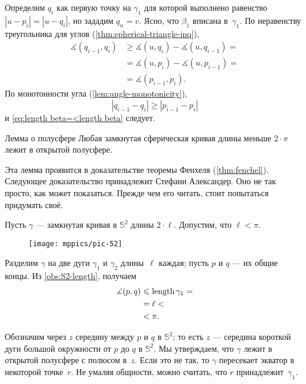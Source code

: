Определим $q_i$ как первую точку на $\gamma_1$ для которой выполнено равенство $|u-p_i|=|u-q_i|$, но зададим $q_n=v$.
Ясно, что $\beta_1$ вписана в~$\gamma_1$.
По неравенству треугольника для углов (\ref{thm:spherical-triangle-inq}),
\begin{align*}
 \measuredangle(q_{i-1},q_i) &\ge  \measuredangle (u, q_i) - \measuredangle ( u , q_{i-1})  =
\\
&= \measuredangle (u,p_i) - \measuredangle (u,p_{i-1}) =
\\
& = \measuredangle(p_{i-1},p_i).
\end{align*}
По монотонности угла (\ref{lem:angle-monotonicity}),
\[|q_{i-1}-q_i|\ge|p_{i-1}-p_i|\]
и \ref{eq:length beta=<length beta} следует.
\qeds


\begin{thm}{Лемма о полусфере}\label{lem:hemisphere}
Любая замкнутая сферическая кривая длины меньше $2\cdot \pi$ лежит в открытой полусфере.
\end{thm}

Эта лемма проявится в доказательстве теоремы Фенхеля (\ref{thm:fenchel}).
Следующее доказательство принадлежит Стефани Александер.
Оно не так просто, как может показаться.
Прежде чем его читать, стоит попытаться придумать своё.

Пусть $\gamma$ --- замкнутая кривая в $\mathbb{S}^2$ длины $2\cdot\ell$.
Допустим, что $\ell<\pi$.

{

\begin{wrapfigure}{o}{35mm}
\vskip-3mm
\centering
\texttt{[image: mppics/pic-52]}
\end{wrapfigure}

Разделим $\gamma$ на две дуги $\gamma_1$ и $\gamma_2$ длины~$\ell$ каждая;
пусть $p$ и $q$ --- их общие концы.
Из \ref{obs:S2-length}, получаем
\begin{align*}
\measuredangle(p,q)&\leqslant \mathop{\rm length}\nolimits \gamma_1=
\\
&= \ell<
\\
&<\pi.
\end{align*}

}

Обозначим через $z$ середину между $p$ и $q$ в $\mathbb{S}^2$;
то есть $z$ --- середина короткой дуги большой окружности от $p$ до $q$ в $\mathbb{S}^2$.
Мы утверждаем, что $\gamma$ лежит в открытой полусфере с полюсом в~$z$.
Если это не так, то $\gamma$ пересекает экватор в некоторой точке~$r$.
Не умаляя общности, можно считать, что $r$ принадлежит~$\gamma_1$.

